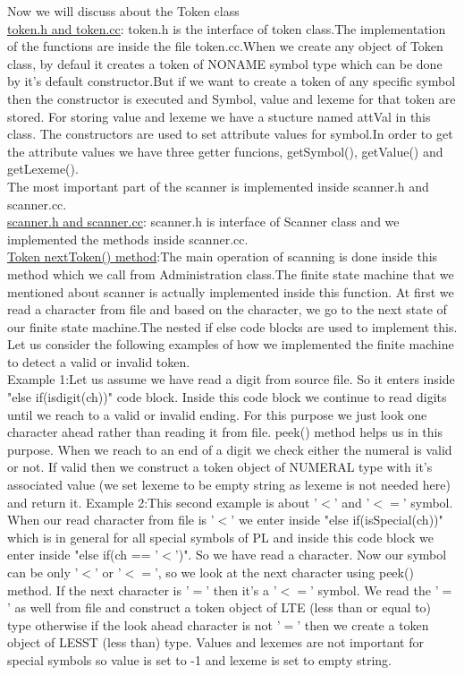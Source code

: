 \documentclass[paper=letter, fontsize=11pt]{scrartcl} %
\begin{document}
Now we will discuss about the Token class\\
\underline {token.h and token.cc}: token.h is the interface of token class.The implementation of the functions are inside the file token.cc.When we create any object of Token class, by defaul it creates a token of NONAME symbol type which can be done by it's default constructor.But if we want to create a token of any specific symbol then the constructor is executed and Symbol, value and lexeme for that token are stored. For storing value and lexeme we have a stucture named attVal in this class. 
The constructors are used to set attribute values for symbol.In order to get the attribute values we have three getter funcions, getSymbol(), getValue() and getLexeme().\\

The most important part of the scanner is implemented inside scanner.h and scanner.cc.\\
\underline {scanner.h and scanner.cc}: scanner.h is interface of Scanner class and we implemented the methods inside scanner.cc.\\

\underline {Token nextToken() method}:The main operation of scanning is done inside this method which we call from Administration class.The finite state machine that we mentioned about scanner is actually implemented inside this function.
At first we read a character from file and based on the character, we go to the next state of our finite state machine.The nested if else code blocks are used to implement this. Let us consider the following examples of how we implemented the finite machine to detect a valid or invalid token.\\

Example 1:Let us assume we have read a digit from source file. So it enters inside "else if(isdigit(ch))" code block. Inside this code block we continue to read digits until we reach to a valid or invalid ending. For this purpose we just look one character ahead rather than reading it from file. peek() method helps us in this purpose. When we reach to an end of a digit we check either the numeral is valid or not. If valid then we construct a token object of NUMERAL type with it's associated value (we set lexeme to be empty string as lexeme is not needed here) and return it. 
Example 2:This second example is about '$<$' and '$<=$' symbol. When our read character from file is '$<$' we enter inside "else if(isSpecial(ch))" which is in general for all special symbols of PL and inside this code block we enter inside "else if(ch == '$<$')". So we have read a character. Now our symbol can be only '$<$' or '$<=$', so we look at the next character using peek() method. If the next character is '$=$' then it's a '$<=$' symbol. We read the '$=$' as well from file and construct a token object of LTE (less than or equal to) type otherwise if the look ahead character is not '$=$' then we create a token object of LESST (less than) type. Values and lexemes are not important for special symbols so value is set to -1 and lexeme is set to empty string.\\
\end{document}

